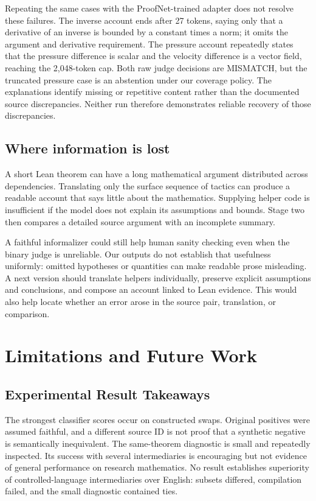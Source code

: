 \documentclass[sigconf,nonacm]{acmart}
\begin{document}
Repeating the same cases with the ProofNet-trained adapter does not resolve these failures. The inverse account ends after 27 tokens, saying only that a derivative of an inverse is bounded by a constant times a norm; it omits the argument and derivative requirement. The pressure account repeatedly states that the pressure difference is scalar and the velocity difference is a vector field, reaching the 2,048-token cap. Both raw judge decisions are MISMATCH, but the truncated pressure case is an abstention under our coverage policy. The explanations identify missing or repetitive content rather than the documented source discrepancies. Neither run therefore demonstrates reliable recovery of those discrepancies.

\subsection{Where information is lost}
A short Lean theorem can have a long mathematical argument distributed across dependencies. Translating only the surface sequence of tactics can produce a readable account that says little about the mathematics. Supplying helper code is insufficient if the model does not explain its assumptions and bounds. Stage two then compares a detailed source argument with an incomplete summary.

A faithful informalizer could still help human sanity checking even when the binary judge is unreliable. Our outputs do not establish that usefulness uniformly: omitted hypotheses or quantities can make readable prose misleading. A next version should translate helpers individually, preserve explicit assumptions and conclusions, and compose an account linked to Lean evidence. This would also help locate whether an error arose in the source pair, translation, or comparison.

\section{Limitations and Future Work}
\subsection{Experimental Result Takeaways}
The strongest classifier scores occur on constructed swaps. Original positives were assumed faithful, and a different source ID is not proof that a synthetic negative is semantically inequivalent. The same-theorem diagnostic is small and repeatedly inspected. Its success with several intermediaries is encouraging but not evidence of general performance on research mathematics. No result establishes superiority of controlled-language intermediaries over English: subsets differed, compilation failed, and the small diagnostic contained ties.
\end{document}
